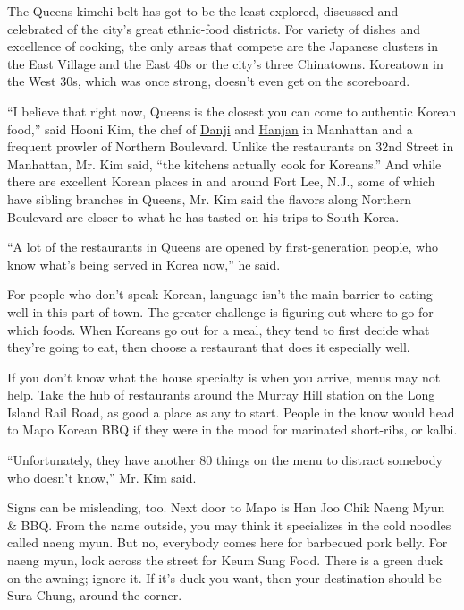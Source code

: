 The Queens kimchi belt has got to be the least explored, discussed and
celebrated of the city's great ethnic-food districts. For variety of
dishes and excellence of cooking, the only areas that compete are the
Japanese clusters in the East Village and the East 40s or the city's
three Chinatowns. Koreatown in the West 30s, which was once strong,
doesn't even get on the scoreboard.

``I believe that right now, Queens is the closest you can come to
authentic Korean food,'' said Hooni Kim, the chef of
\href{http://www.nytimes3xbfgragh.onion/2011/08/17/dining/reviews/danji-manhattan-restaurant-review.html?pagewanted=all\&module=Search\&mabReward=relbias\%3Ar\%2C\%7B\%221\%22\%3A\%22RI\%3A10\%22\%7D\&_r=0}{Danji}
and
\href{http://www.nytimes3xbfgragh.onion/2013/04/03/dining/reviews/restaurant-review-hanjan-in-manhattan.html?pagewanted=all\&module=Search\&mabReward=relbias\%3Ar\%2C\%7B\%221\%22\%3A\%22RI\%3A10\%22\%7D}{Hanjan}
in Manhattan and a frequent prowler of Northern Boulevard. Unlike the
restaurants on 32nd Street in Manhattan, Mr. Kim said, ``the kitchens
actually cook for Koreans.'' And while there are excellent Korean places
in and around Fort Lee, N.J., some of which have sibling branches in
Queens, Mr. Kim said the flavors along Northern Boulevard are closer to
what he has tasted on his trips to South Korea.

``A lot of the restaurants in Queens are opened by first-generation
people, who know what's being served in Korea now,'' he said.

For people who don't speak Korean, language isn't the main barrier to
eating well in this part of town. The greater challenge is figuring out
where to go for which foods. When Koreans go out for a meal, they tend
to first decide what they're going to eat, then choose a restaurant that
does it especially well.

If you don't know what the house specialty is when you arrive, menus may
not help. Take the hub of restaurants around the Murray Hill station on
the Long Island Rail Road, as good a place as any to start. People in
the know would head to Mapo Korean BBQ if they were in the mood for
marinated short-ribs, or kalbi.

``Unfortunately, they have another 80 things on the menu to distract
somebody who doesn't know,'' Mr. Kim said.

Signs can be misleading, too. Next door to Mapo is Han Joo Chik Naeng
Myun \& BBQ. From the name outside, you may think it specializes in the
cold noodles called naeng myun. But no, everybody comes here for
barbecued pork belly. For naeng myun, look across the street for Keum
Sung Food. There is a green duck on the awning; ignore it. If it's duck
you want, then your destination should be Sura Chung, around the corner.

